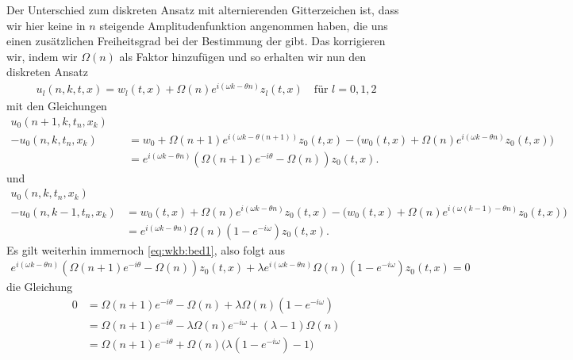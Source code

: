 {Der Unterschied zum diskreten Ansatz mit alternierenden Gitterzeichen ist, dass wir hier keine in $n$ steigende Amplitudenfunktion
angenommen haben, die uns einen zusätzlichen Freiheitsgrad bei der Bestimmung der gibt.
Das korrigieren wir, indem wir $\Omega(n)$ als Faktor hinzufügen und so erhalten wir nun den diskreten Ansatz
\begin{align}\label{wkb:diskret:ansatz}
u_l(n,k,t,x) = w_l(t,x) + \Omega(n) e^{i (\omega k - \theta n)} z_l(t,x) \quad \text{für $l=0,1,2$}
\end{align}
mit den Gleichungen
{\small\begin{align}\nonumber
u_0(n+1, k, t_n, x_k) \quad &\\
- u_0(n, k, t_n, x_k) &= w_0 + \Omega(n+1) e^{i (\omega k - \theta (n+1))} z_0(t,x) - \bigl( w_0(t,x) + \Omega(n) e^{i (\omega k - \theta n)} z_0(t,x) \bigr)\\
&= e^{i (\omega k - \theta n)} (\Omega(n+1) e^{-i\theta} - \Omega(n)) z_0(t,x).
\end{align}}
und
{\small\begin{align}\nonumber
u_0(n,k,t_n,x_k) \qquad&\\
- u_0(n,k-1,t_n,x_k)
&= w_0(t,x) + \Omega(n) e^{i (\omega k - \theta n)} z_0(t,x) - \bigl( w_0(t,x) + \Omega(n) e^{i (\omega (k-1) - \theta n)} z_0(t,x) \bigr)\\
&= e^{i (\omega k - \theta n)} \Omega(n) (1 - e^{-i \omega}) z_0(t,x).
\end{align}}
Es gilt weiterhin immernoch \eqref{eq:wkb:bed1}, also folgt aus
\begin{align}
e^{i (\omega k - \theta n)} (\Omega(n+1) e^{-i\theta} - \Omega(n)) z_0(t,x) + \lambda e^{i (\omega k - \theta n)} \Omega(n) (1 - e^{-i \omega}) z_0(t,x) = 0
\end{align}
die Gleichung
\begin{align}
0 &= \Omega(n+1) e^{-i\theta} - \Omega(n) + \lambda \Omega(n) (1 - e^{-i \omega})\\
&= \Omega(n+1) e^{-i\theta} - \lambda \Omega(n) e^{-i\omega} + (\lambda - 1) \Omega(n)\\
&= \Omega(n+1) e^{-i\theta} + \Omega(n) \bigl( \lambda (1 - e^{-i\omega}) - 1 \bigr)
\end{align}

}
